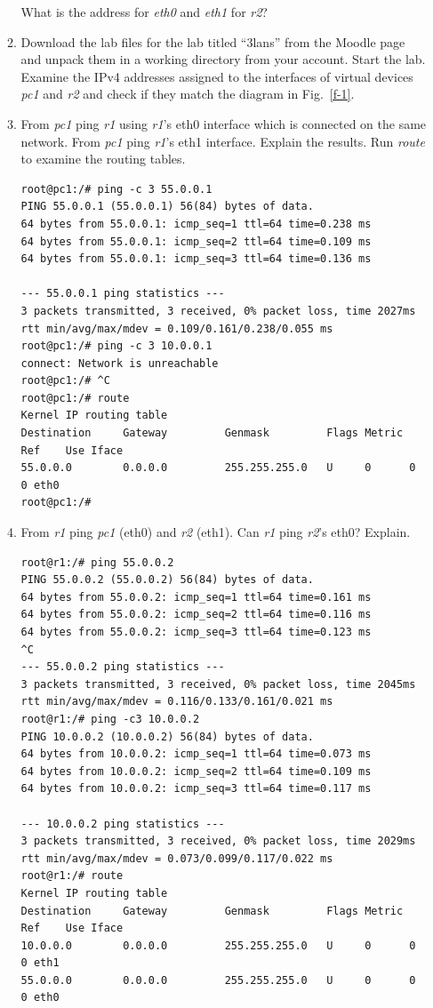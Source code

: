 \documentclass[12pt]{book}
\begin{document}
\begin{enumerate}[label=\arabic*.]
\begin{enumerate}[label=Activity \arabic*:]
  What is the address for \emph{eth0} and \emph{eth1} for \emph{r2}?

\item Download the lab files for the lab titled ``3lans'' from the Moodle page and unpack them in a working directory from your account. Start the lab. Examine the IPv4 addresses assigned to the interfaces of virtual devices \emph{pc1} and \emph{r2} and check if they match the diagram in Fig.~\ref{f-1}.

\item From \emph{pc1} ping \emph{r1} using \emph{r1}'s eth0 interface which is connected on the same network. From \emph{pc1} ping \emph{r1}'s eth1 interface. Explain the results. Run \emph{route} to examine the routing tables.
  \begin{lstlisting}
root@pc1:/# ping -c 3 55.0.0.1
PING 55.0.0.1 (55.0.0.1) 56(84) bytes of data.
64 bytes from 55.0.0.1: icmp_seq=1 ttl=64 time=0.238 ms
64 bytes from 55.0.0.1: icmp_seq=2 ttl=64 time=0.109 ms
64 bytes from 55.0.0.1: icmp_seq=3 ttl=64 time=0.136 ms

--- 55.0.0.1 ping statistics ---
3 packets transmitted, 3 received, 0% packet loss, time 2027ms
rtt min/avg/max/mdev = 0.109/0.161/0.238/0.055 ms
root@pc1:/# ping -c 3 10.0.0.1
connect: Network is unreachable
root@pc1:/# ^C
root@pc1:/# route
Kernel IP routing table
Destination     Gateway         Genmask         Flags Metric Ref    Use Iface
55.0.0.0        0.0.0.0         255.255.255.0   U     0      0        0 eth0
root@pc1:/#
  \end{lstlisting}

\item From \emph{r1} ping \emph{pc1} (eth0) and \emph{r2} (eth1). Can \emph{r1} ping \emph{r2}'s eth0? Explain. 

  \begin{lstlisting}
root@r1:/# ping 55.0.0.2
PING 55.0.0.2 (55.0.0.2) 56(84) bytes of data.
64 bytes from 55.0.0.2: icmp_seq=1 ttl=64 time=0.161 ms
64 bytes from 55.0.0.2: icmp_seq=2 ttl=64 time=0.116 ms
64 bytes from 55.0.0.2: icmp_seq=3 ttl=64 time=0.123 ms
^C
--- 55.0.0.2 ping statistics ---
3 packets transmitted, 3 received, 0% packet loss, time 2045ms
rtt min/avg/max/mdev = 0.116/0.133/0.161/0.021 ms
root@r1:/# ping -c3 10.0.0.2
PING 10.0.0.2 (10.0.0.2) 56(84) bytes of data.
64 bytes from 10.0.0.2: icmp_seq=1 ttl=64 time=0.073 ms
64 bytes from 10.0.0.2: icmp_seq=2 ttl=64 time=0.109 ms
64 bytes from 10.0.0.2: icmp_seq=3 ttl=64 time=0.117 ms

--- 10.0.0.2 ping statistics ---
3 packets transmitted, 3 received, 0% packet loss, time 2029ms
rtt min/avg/max/mdev = 0.073/0.099/0.117/0.022 ms
root@r1:/# route
Kernel IP routing table
Destination     Gateway         Genmask         Flags Metric Ref    Use Iface
10.0.0.0        0.0.0.0         255.255.255.0   U     0      0        0 eth1
55.0.0.0        0.0.0.0         255.255.255.0   U     0      0        0 eth0
  \end{lstlisting}
\end{enumerate}



\end{enumerate}
\end{document}

